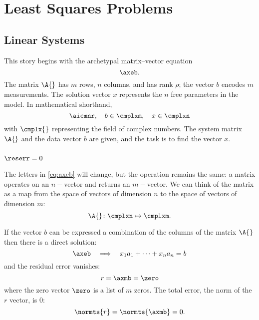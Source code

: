 \chapter{Least Squares Problems}

\section{Linear Systems}  %

  This story begins with the archetypal  matrix--vector equation
  \begin{equation}   %
    \axeb .
    \label{eq:axeb}
  \end{equation}
The matrix $\A{}$ has $m$ rows, $n$ columns, and has rank $\rho$; the vector $b$ encodes $m$ measurements. The solution vector $x$ represents the $n$ free parameters in the model. In mathematical shorthand,
  \begin{equation}   %
    \aicmnr, \quad b \in \cmplxm, \quad x \in \cmplxn
  \label{eq:basics}
  \end{equation}
with $\cmplx{}$ representing the field of complex numbers. The system matrix $\A{}$ and the data vector $b$ are given, and the task is to find the vector $x$.

\subsection{$\reserr = 0$}  %
The letters in \eqref{eq:axeb} will change, but the operation remains the same: a matrix operates on an $n-$vector and returns an $m-$vector. We can think of the  matrix as a map from the space of vectors of dimension $n$ to the space of vectors of dimension $m$:
  \begin{equation*}   %
    \A{} \colon \cmplxn \mapsto \cmplxm .
  \end{equation*}

If the vector $b$ can be expressed a combination of the columns of the matrix $\A{}$ then there is a direct solution:
\begin{equation*}
    \axeb \quad \Longrightarrow \quad x_{1} a_{1} + \cdots + x_{n} a_{n} = b
\end{equation*}
and the residual error  vanishes:
  \begin{equation*}   %
      r = \axmb = \zero
  \label{eq:axmb}
  \end{equation*}
where the zero vector $\zero$ is a list of $m$ zeros. The total error, the norm of the $r$ vector, is 0:
  \begin{equation*}   %
      \normts{r} = \normts{\axmb} = 0.
  \end{equation*}

